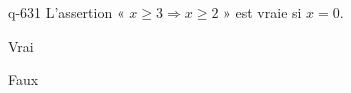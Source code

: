 \begin{truefalse}{q-631}
L'assertion « $x\geq 3 \Rightarrow x \geq 2$ » est vraie si $x=0$.
\item* Vrai
\item Faux
\end{truefalse}

